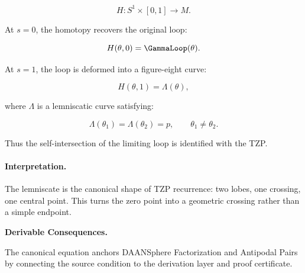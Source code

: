 \begin{equation}
H:S^1\times[0,1]\to M .
\end{equation}

At $s=0$, the homotopy recovers the original loop:

\begin{equation}
H(\theta,0)=\GammaLoop(\theta).
\end{equation}

At $s=1$, the loop is deformed into a figure-eight curve:

\begin{equation}
H(\theta,1)=\Lambda(\theta),
\end{equation}

where $\Lambda$ is a lemniscatic curve satisfying:

\begin{equation}
\Lambda(\theta_1)=\Lambda(\theta_2)=p,
\qquad
\theta_1\neq\theta_2 .
\end{equation}

Thus the self-intersection of the limiting loop is identified with the TZP.

\paragraph{Interpretation.}
The lemniscate is the canonical shape of TZP recurrence: two lobes, one crossing, one central point. This turns the zero point into a geometric crossing rather than a simple endpoint.

\par\vspace{0.35em}
\noindent\textbf{Derivable Consequences.}\quad
\begingroup
\footnotesize
\raggedright
The canonical equation anchors DAANSphere Factorization and Antipodal Pairs by connecting the source condition to the derivation layer and proof certificate.
\par\endgroup

